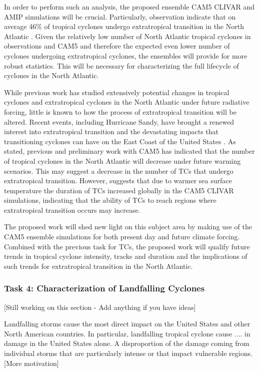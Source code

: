 \documentclass[11pt]{article}
\begin{document}
In order to perform such an analysis, the proposed ensemble CAM5 CLIVAR and AMIP simulations will be crucial.  Particularly, observation indicate that on average 46$\%$ of tropical cyclones undergo extratropical transition in the North Atlantic \citep{hart2001climatology}. Given the relatively low number of North Atlantic tropical cyclones in observations and CAM5 and therefore the expected even lower number of cyclones undergoing extratropical cyclones, the ensembles will provide for more robust statistics. This will be necessary for characterizing the full lifecycle of cyclones in the North Atlantic. 

While previous work has studied extensively potential changes in tropical cyclones and extratropical cyclones in the North Atlantic under future radiative forcing, little is known to how the process of extratropical transition will be altered. Recent events, including Hurricane Sandy, have brought a renewed interest into extratropical transition and the devastating impacts that transitioning cyclones can have on the East Coast of the United States \citep{Blake2013}. As stated, previous and preliminary work with CAM5 has indicated that the number of tropical cyclones in the North Atlantic will decrease under future warming scenarios. This may suggest a decrease in the number of TCs that undergo extratropical transition.  However, \citet{Wehner2015} suggests that due to warmer sea surface temperature the duration of TCs increased globally in the CAM5 CLIVAR simulations, indicating that the ability of TCs to reach regions where extratropical transition occurs may increase.

The proposed work will shed new light on this subject area by making use of the CAM5 ensemble simulations for both present day and future climate forcing. Combined with the previous task for TCs, the proposed work will qualify future trends in tropical cyclone intensity, tracks and duration and the implications of such trends for extratropical transition in the North Atlantic.

\subsubsection{Task 4: Characterization of Landfalling Cyclones}

{\color{red}[Still working on this section - Add anything if you have ideas]}

Landfalling storms cause the most direct impact on the United States and other North American countries.  In particular, landfalling tropical cyclone cause .... in damage in the United States alone. A disproportion of the damage coming from individual storms that are particularly intense or that impact vulnerable regions.  {\color{red}[More motivation]}
\end{document}
